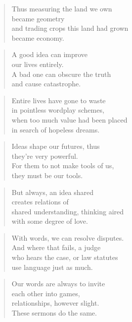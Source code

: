 \documentclass[14pt,a4paper]{article}
\begin{document}
\begin{verse}
Thus measuring the land we own\\
became geometry\\
and trading crops this land had grown\\
became economy.
\end{verse}

\begin{verse}
A good idea can improve\\
our lives entirely.\\
A bad one can obscure the truth\\
and cause catastrophe.
\end{verse}

\begin{verse}
Entire lives have gone to waste\\
in pointless wordplay schemes,\\
when too much value had been placed\\
in search of hopeless dreams.
\end{verse}

\begin{verse}
Ideas shape our futures, thus\\
they’re very powerful.\\
For them to not make tools of us,\\
they must be our tools.
\end{verse}

\begin{verse}
But always, an idea shared\\
creates relations of\\
shared understanding, thinking aired\\
with some degree of love.
\end{verse}

\begin{verse}
With words, we can resolve disputes.\\
And where that fails, a judge\\
who hears the case, or law statutes\\
use language just as much.
\end{verse}

\begin{verse}
Our words are always to invite\\
each other into games,\\
relationships, however slight.\\
These sermons do the same.
\end{verse}
\end{document}

